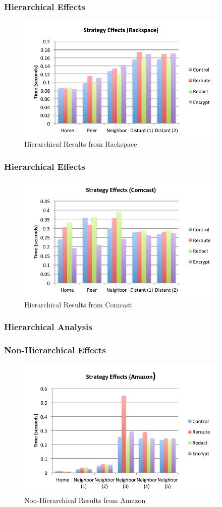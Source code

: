 \documentclass[t,handout]{beamer}
\begin{document}
\begin{frame}
\frametitle{Hierarchical Effects}
\begin{figure}[!t]
\centering
\includegraphics[width=4in]{strategy_effects_rs}
\caption{Hierarchical Results from Rackspace}
\end{figure}
\end{frame}

\begin{frame}
\frametitle{Hierarchical Effects}
\begin{figure}[!t]
\centering
\includegraphics[width=4in]{strategy_effects_local}
\caption{Hierarchical Results from Comcast}
\end{figure}
\end{frame}

\begin{frame}
\frametitle{Hierarchical Analysis}

\end{frame}

\begin{frame}
\frametitle{Non-Hierarchical Effects}
\begin{figure}[!t]
\centering
\includegraphics[width=4in]{nh_strategy_effects_az}
\caption{Non-Hierarchical Results from Amazon}
\end{figure}
\end{frame}
\end{document}
